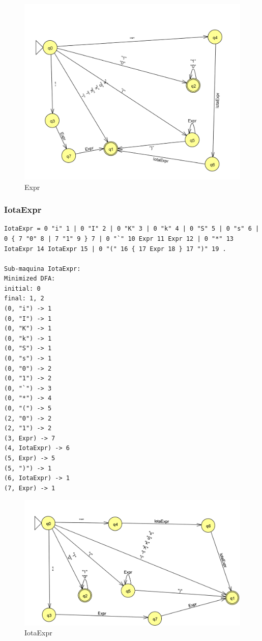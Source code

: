 \begin{figure}[H]
\centering
\includegraphics[width=12cm,keepaspectratio]{jflap-automatas/expr.png}
\caption{\label{fig:jflap-expr} Expr}
\end{figure}

\subsubsection{IotaExpr}

\begin{lstlisting}  
IotaExpr = 0 "i" 1 | 0 "I" 2 | 0 "K" 3 | 0 "k" 4 | 0 "S" 5 | 0 "s" 6 | 0 { 7 "0" 8 | 7 "1" 9 } 7 | 0 "`" 10 Expr 11 Expr 12 | 0 "*" 13 IotaExpr 14 IotaExpr 15 | 0 "(" 16 { 17 Expr 18 } 17 ")" 19 .
            
Sub-maquina IotaExpr: 
Minimized DFA: 
initial: 0
final: 1, 2
(0, "i") -> 1
(0, "I") -> 1
(0, "K") -> 1
(0, "k") -> 1
(0, "S") -> 1
(0, "s") -> 1
(0, "0") -> 2
(0, "1") -> 2
(0, "`") -> 3
(0, "*") -> 4
(0, "(") -> 5
(2, "0") -> 2
(2, "1") -> 2
(3, Expr) -> 7
(4, IotaExpr) -> 6
(5, Expr) -> 5
(5, ")") -> 1
(6, IotaExpr) -> 1
(7, Expr) -> 1
\end{lstlisting}

\begin{figure}[H]
\centering
\includegraphics[width=12cm,keepaspectratio]{jflap-automatas/iotaexpr.png}
\caption{\label{fig:jflap-iotaexpr} IotaExpr}
\end{figure}
